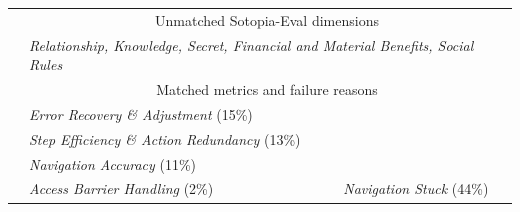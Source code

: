 \begin{table}[!t]
\begin{tabular}{@{}lp{}p{}@{}}
		\cmidrule(lr){2-3}                                                                                & \multicolumn{2}{c}{Unmatched Sotopia-Eval dimensions}                                                                                                                                                                                          \\
		\cmidrule(lr){2-3}                                                                                & \multicolumn{2}{C{0.93\textwidth}}{\cellcolor{unmatched}\textit{Relationship, Knowledge, Secret, Financial and Material Benefits, Social Rules}}                                                                                               \\
		\midrule \multirow{14}{*}{\rotatebox[origin=c]{90}{\textbf{WebVoyager} \citep{he2024webvoyager}}} & \multicolumn{2}{c}{Matched metrics and failure reasons}                                                                                                                                                                                        \\
		\cmidrule(lr){2-3}                                                                                & \cellcolor{navstuck}\textit{Error Recovery \& Adjustment} (15\%)                                                                                                                                                                              & \cellcolor{navstuck}                                                      \\
		                                                                                                  & \cellcolor{navstuck}\textit{Step Efficiency \& Action Redundancy} (13\%)                                                                                                                                                                      & \cellcolor{navstuck}                                                      \\
		                                                                                                  & \cellcolor{navstuck}\textit{Navigation Accuracy} (11\%)                                                                                                                                                                                       & \cellcolor{navstuck}                                                      \\
		                                                                                                  & \cellcolor{navstuck}\textit{Access Barrier Handling} (2\%)                                                                                                                                                                                    & \multirow{-4}{*}{\cellcolor{navstuck}\textit{Navigation Stuck} (44\%)}    \\

\end{tabular}
\end{table}
